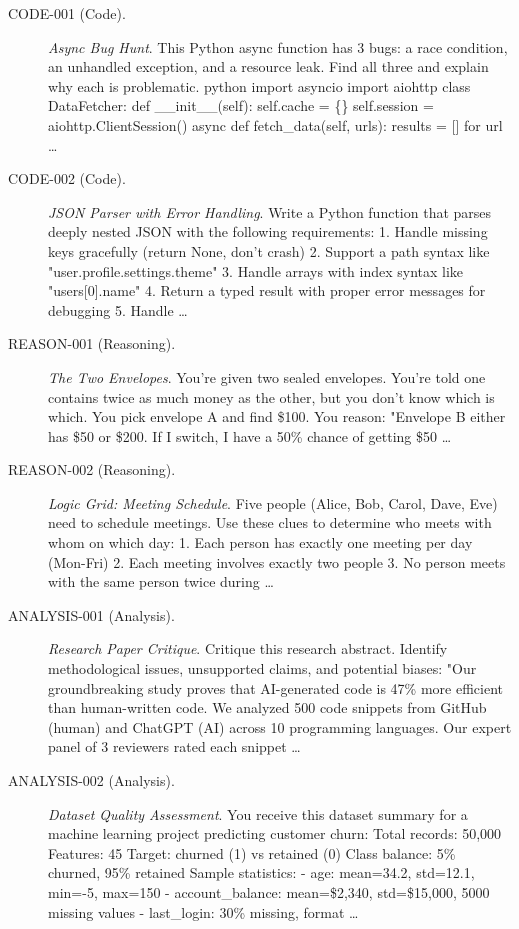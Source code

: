\begin{description}
\item[CODE-001 (Code).] \textit{Async Bug Hunt}. This Python async function has 3 bugs: a race condition, an unhandled exception, and a resource leak. Find all three and explain why each is problematic. python import asyncio import aiohttp class DataFetcher: def \_\_init\_\_(self): self.cache = \{\} self.session = aiohttp.ClientSession() async def fetch\_data(self, urls): results = [] for url \ldots
\item[CODE-002 (Code).] \textit{JSON Parser with Error Handling}. Write a Python function that parses deeply nested JSON with the following requirements: 1. Handle missing keys gracefully (return None, don't crash) 2. Support a path syntax like "user.profile.settings.theme" 3. Handle arrays with index syntax like "users[0].name" 4. Return a typed result with proper error messages for debugging 5. Handle \ldots
\item[REASON-001 (Reasoning).] \textit{The Two Envelopes}. You're given two sealed envelopes. You're told one contains twice as much money as the other, but you don't know which is which. You pick envelope A and find \$100. You reason: "Envelope B either has \$50 or \$200. If I switch, I have a 50\% chance of getting \$50 \ldots
\item[REASON-002 (Reasoning).] \textit{Logic Grid: Meeting Schedule}. Five people (Alice, Bob, Carol, Dave, Eve) need to schedule meetings. Use these clues to determine who meets with whom on which day: 1. Each person has exactly one meeting per day (Mon-Fri) 2. Each meeting involves exactly two people 3. No person meets with the same person twice during \ldots
\item[ANALYSIS-001 (Analysis).] \textit{Research Paper Critique}. Critique this research abstract. Identify methodological issues, unsupported claims, and potential biases: "Our groundbreaking study proves that AI-generated code is 47\% more efficient than human-written code. We analyzed 500 code snippets from GitHub (human) and ChatGPT (AI) across 10 programming languages. Our expert panel of 3 reviewers rated each snippet \ldots
\item[ANALYSIS-002 (Analysis).] \textit{Dataset Quality Assessment}. You receive this dataset summary for a machine learning project predicting customer churn: Total records: 50,000 Features: 45 Target: churned (1) vs retained (0) Class balance: 5\% churned, 95\% retained Sample statistics: - age: mean=34.2, std=12.1, min=-5, max=150 - account\_balance: mean=\$2,340, std=\$15,000, 5000 missing values - last\_login: 30\% missing, format \ldots

\end{description}
